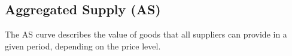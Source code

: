 
%

%



%







\pbn
\subsection{Aggregated Supply (AS)}
The AS curve describes the value of goods that all suppliers can provide in a given period, depending on the price level. 

